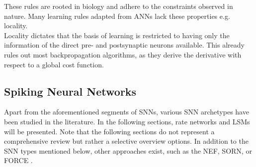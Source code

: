 These rules are rooted in biology and adhere to the constraints observed in nature. Many learning rules adapted from \acp{ANN} lack these properties e.g. locality.\\
Locality dictates that the basis of learning is restricted to having only the information of the direct pre- and postsynaptic neurons available. This already rules out most backpropagation algorithms, as they derive the derivative with respect to a global cost function.


\subsection{Spiking Neural Networks}\label{sec:spiking-neural-networks}
Apart from the aforementioned segments of \acp{SNN}, various \ac{SNN} archetypes have been studied in the literature. In the following sections, rate networks and \acp{LSM} will be presented. Note that the following sections do not represent a comprehensive review but rather a selective overview options. In addition to the \ac{SNN} types mentioned below, other approaches exist, such as the \ac{NEF}\cite{eliasmith_neural_2004}, SORN\cite{lazar_sorn_2009}, or FORCE \cite{nicola_supervised_2017}.

